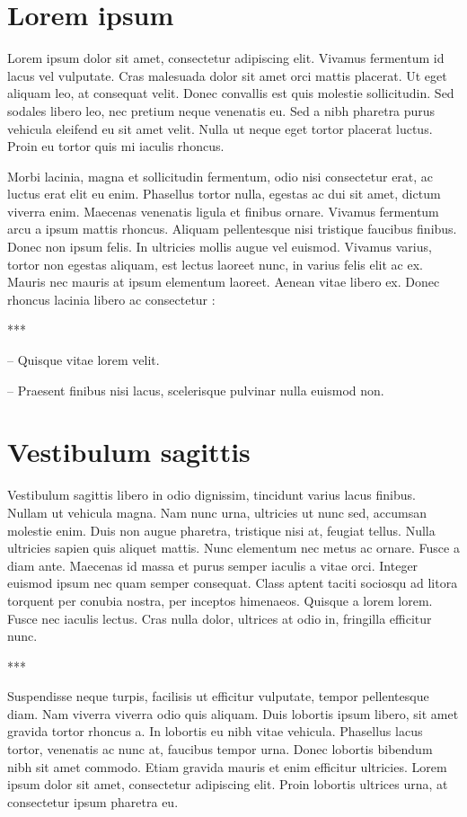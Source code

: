\documentclass{book}
\begin{document}
\chapter{Lorem ipsum}

Lorem ipsum dolor sit amet, consectetur adipiscing elit. Vivamus fermentum id lacus vel vulputate. Cras malesuada dolor sit amet orci mattis placerat. Ut eget aliquam leo, at consequat velit. Donec convallis est quis molestie sollicitudin. Sed sodales libero leo, nec pretium neque venenatis eu. Sed a nibh pharetra purus vehicula eleifend eu sit amet velit. Nulla ut neque eget tortor placerat luctus. Proin eu tortor quis mi iaculis rhoncus.

Morbi lacinia, magna et sollicitudin fermentum, odio nisi consectetur erat, ac luctus erat elit eu enim. Phasellus tortor nulla, egestas ac dui sit amet, dictum viverra enim. Maecenas venenatis ligula et finibus ornare. Vivamus fermentum arcu a ipsum mattis rhoncus. Aliquam pellentesque nisi tristique faucibus finibus. Donec non ipsum felis. In ultricies mollis augue vel euismod. Vivamus varius, tortor non egestas aliquam, est lectus laoreet nunc, in varius felis elit ac ex. Mauris nec mauris at ipsum elementum laoreet. Aenean vitae libero ex. Donec rhoncus lacinia libero ac consectetur :

\centerline{***}

-- Quisque vitae lorem velit.

-- Praesent finibus nisi lacus, scelerisque pulvinar nulla euismod non.

\chapter{Vestibulum sagittis}

Vestibulum sagittis libero in odio dignissim, tincidunt varius lacus finibus. Nullam ut vehicula magna. Nam nunc urna, ultricies ut nunc sed, accumsan molestie enim. Duis non augue pharetra, tristique nisi at, feugiat tellus. Nulla ultricies sapien quis aliquet mattis. Nunc elementum nec metus ac ornare. Fusce a diam ante. Maecenas id massa et purus semper iaculis a vitae orci. Integer euismod ipsum nec quam semper consequat. Class aptent taciti sociosqu ad litora torquent per conubia nostra, per inceptos himenaeos. Quisque a lorem lorem. Fusce nec iaculis lectus. Cras nulla dolor, ultrices at odio in, fringilla efficitur nunc.

\centerline{***}

Suspendisse neque turpis, facilisis ut efficitur vulputate, tempor pellentesque diam. Nam viverra viverra odio quis aliquam. Duis lobortis ipsum libero, sit amet gravida tortor rhoncus a. In lobortis eu nibh vitae vehicula. Phasellus lacus tortor, venenatis ac nunc at, faucibus tempor urna. Donec lobortis bibendum nibh sit amet commodo. Etiam gravida mauris et enim efficitur ultricies. Lorem ipsum dolor sit amet, consectetur adipiscing elit. Proin lobortis ultrices urna, at consectetur ipsum pharetra eu.
\end{document}
